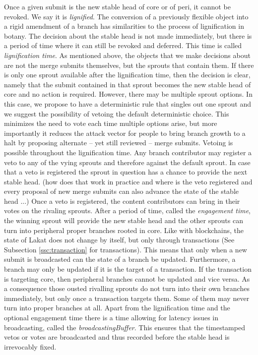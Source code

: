 \documentclass[14pt]{article}
\newcommand{\remark}[1]{{\color{purple} (#1)}}
\begin{document}
Once a given submit is the new stable head of core or of peri, it cannot be revoked. We say it is \textit{lignified}. The conversion of a previously flexible object into a rigid amendment of a branch has similarities to the process of lignification in botany. 
The decision about the stable head is not made immediately, but there is a period of time where it can still be revoked and deferred. This time is called \textit{lignification time}. As mentioned above, the objects that we make decisions about are not the merge submits themselves, but the sprouts that contain them. If there is only one sprout available after the lignification time, then the decision is clear, namely that the submit contained in that sprout becomes the new stable head of core and no action is required. However, there may be multiple sprout options. In this case, we propose to have a deterministic rule that singles out one sprout and we suggest the possibility of vetoing the default deterministic choice. This minimizes the need to vote each time multiple options arise, but more importantly it reduces the attack vector for people to bring branch growth to a halt by proposing alternate -- yet still reviewed -- merge submits. Vetoing is possible throughout the lignification time. Any branch contributor may register a veto to any of the vying sprouts and therefore against the default sprout. In case that a veto is registered the sprout in question has a chance to provide the next stable head. \remark{how does that work in practice and where is the veto registered and every proposal of new merge submits can also advance the state of the stable head ...}
Once a veto is registered, the content contributors can bring in their votes on the rivaling sprouts. After a period of time, called the \textit{engagement time}, the winning sprout will provide the new stable head and the other sprouts can turn into peripheral proper branches rooted in core. Like with blockchains, the state of Lakat does not change by itself, but only through transactions (See Subsection \ref{ssc:transaction} for transactions). This means that only when a new submit is broadcasted can the state of a branch be updated. Furthermore, a branch may only be updated if it is the target of a transaction. If the transaction is targeting core, then peripheral branches cannot be updated and vice versa. As a consequence those ousted rivalling sprouts do not turn into their own branches immediately, but only once a transaction targets them. Some of them may never turn into proper branches at all. Apart from the lignification time and the optional engagement time there is a time allowing for latency issues in broadcasting, called the \textit{broadcastingBuffer}. This ensures that the timestamped vetos or votes are broadcasted and thus recorded before the stable head is irrevocably fixed.
\end{document}
